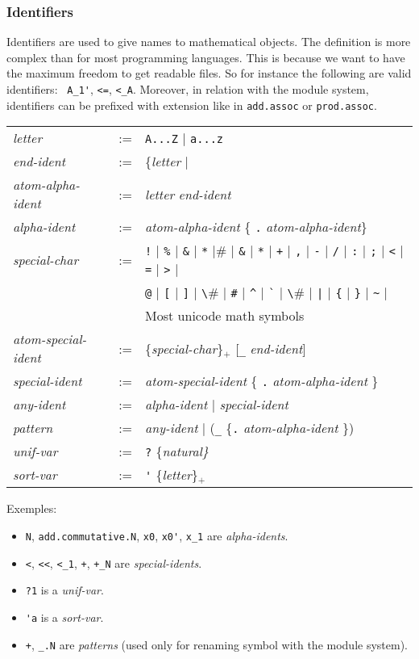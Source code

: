 \subsubsection*{Identifiers}

Identifiers are used to give names to mathematical objects. The definition is
more complex than for most programming languages. This is because we want to
have the maximum freedom to get readable files. So for instance the following
are valid identifiers: \verb# A_1'#, \verb#<=#, \verb#<_A#. Moreover, in
relation with the module system, identifiers can be prefixed with extension
like in \verb#add.assoc# or \verb#prod.assoc#.

\begin{tabular}{lcl}
{\it letter} &:=& \verb#A...Z# $|$ \verb#a...z#
\\
{\it end-ident}&:=&\{{\it letter} $|$ \verb#0...9# $|$ \verb#_# \} \{ \verb#'# \}
\\
{\it atom-alpha-ident} &:=& {\it letter} {\it end-ident}
\\
{\it alpha-ident} &:=& {\it atom-alpha-ident} \{ \verb#.# {\it
  atom-alpha-ident}\}
\\
{\it special-char} &:=& \verb#!# $|$ \verb#%# $|$ \verb#&# $|$ \verb#*# $|$
  \verb#+# $|$ \verb#,# $|$ \verb#-# $|$ \verb#/# $|$ \verb#:# $|$ \verb#;# $|$
  \verb#<# $|$ \verb#=# $|$ \verb#># $|$ \\
& & \verb#@# $|$ \verb#[# $|$ \verb#]# $|$ \verb#\# $|$ \verb+#+ $|$
  \verb#^# $|$ \verb#`# $|$ \verb#\# $|$ \verb#|# $|$
  \verb#{# $|$ \verb#}# $|$
  \verb#~# $|$ \\
& & Most unicode math symbols
\\
{\it atom-special-ident} &:=& \{{\it special-char}\}$_+$ [\verb#_# {\it
  end-ident}]
\\
{\it special-ident} &:=& {\it atom-special-ident} \{ \verb#.# {\it
  atom-alpha-ident} \}
\\
{\it any-ident} &:=& {\it alpha-ident} $|$ {\it special-ident}
\\
{\it pattern} &:=& {\it any-ident} $|$ (\verb#_# \{\verb#.# {\it
  atom-alpha-ident} \})
\\
{\it unif-var} &:=& \verb#?# \{\it natural\}
\\
{\it sort-var} &:=& \verb#'# \{{\it letter}\}$_+$
\end{tabular}

\medskip
\noindent Exemples:
\begin{itemize}
\item \verb#N#, \verb#add.commutative.N#, \verb#x0#, \verb#x0'#,
\verb#x_1#
are {\it alpha-idents}.
\item \verb#<#, \verb#<<#, \verb#<_1#, \verb#+#, \verb#+_N# are
{\it special-idents}.
\item \verb#?1# is a {\it unif-var}.
\item \verb#'a# is a {\it sort-var}.
\item \verb#+#, \verb#_.N# are   {\it patterns} (used only for renaming
symbol with the module system).
\end{itemize}


